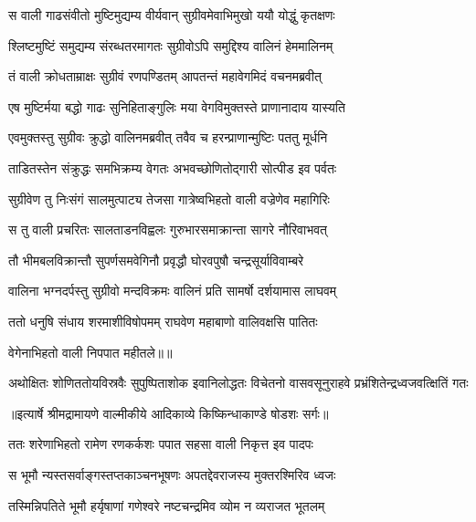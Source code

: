 \twolineshloka
{स वाली गाढसंवीतो मुष्टिमुद्यम्य वीर्यवान्}
{सुग्रीवमेवाभिमुखो ययौ योद्धुं कृतक्षणः} %

\twolineshloka
{श्लिष्टमुष्टिं समुद्यम्य संरब्धतरमागतः}
{सुग्रीवोऽपि समुद्दिश्य वालिनं हेममालिनम्} %

\twolineshloka
{तं वाली क्रोधताम्राक्षः सुग्रीवं रणपण्डितम्}
{आपतन्तं महावेगमिदं वचनमब्रवीत्} %

\twolineshloka
{एष मुष्टिर्मया बद्धो गाढः सुनिहिताङ्गुलिः}
{मया वेगविमुक्तस्ते प्राणानादाय यास्यति} %

\twolineshloka
{एवमुक्तस्तु सुग्रीवः क्रुद्धो वालिनमब्रवीत्}
{तवैव च हरन्प्राणान्मुष्टिः पततु मूर्धनि} %

\twolineshloka
{ताडितस्तेन संक्रुद्धः समभिक्रम्य वेगतः}
{अभवच्छोणितोद्गारी सोत्पीड इव पर्वतः} %

\twolineshloka
{सुग्रीवेण तु निःसंगं सालमुत्पाट्य तेजसा}
{गात्रेष्वभिहतो वाली वज्रेणेव महागिरिः} %

\twolineshloka
{स तु वाली प्रचरितः सालताडनविह्वलः}
{गुरुभारसमाक्रान्ता सागरे नौरिवाभवत्} %

\twolineshloka
{तौ भीमबलविक्रान्तौ सुपर्णसमवेगिनौ}
{प्रवृद्धौ घोरवपुषौ चन्द्रसूर्याविवाम्बरे} %

\twolineshloka
{वालिना भग्नदर्पस्तु सुग्रीवो मन्दविक्रमः}
{वालिनं प्रति सामर्षो दर्शयामास लाघवम्} %

\twolineshloka
{ततो धनुषि संधाय शरमाशीविषोपमम्}
{राघवेण महाबाणो वालिवक्षसि पातितः} %

{वेगेनाभिहतो वाली निपपात महीतले॥॥} %

\addtocounter{shlokacount}{1}

\fourlineindentedshloka
{अथोक्षितः शोणिततोयविस्रवैः}
{ सुपुष्पिताशोक इवानिलोद्धतः}
{विचेतनो वासवसूनुराहवे}
{ प्रभ्रंशितेन्द्रध्वजवत्क्षितिं गतः} %


{॥इत्यार्षे श्रीमद्रामायणे वाल्मीकीये आदिकाव्ये किष्किन्धाकाण्डे षोडशः सर्गः॥}


\twolineshloka
{ततः शरेणाभिहतो रामेण रणकर्कशः}
{पपात सहसा वाली निकृत्त इव पादपः} %

\twolineshloka
{स भूमौ न्यस्तसर्वाङ्गस्तप्तकाञ्चनभूषणः}
{अपतद्देवराजस्य मुक्तरश्मिरिव ध्वजः} %

\twolineshloka
{तस्मिन्निपतिते भूमौ हर्यृषाणां गणेश्वरे}
{नष्टचन्द्रमिव व्योम न व्यराजत भूतलम्} %

